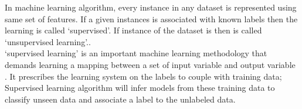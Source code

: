 In machine learning algorithm, every instance in any dataset is represented using same set of features. If a given instances is associated with known labels then the learning is called `supervised'. If instance of the dataset is  then is called `unsupervised learning'.\cite{maglogiannis2007emerging}.\\

`supervised learning' is an important machine learning methodology that demands learning a mapping between a set of input variable and output variable . It prescribes the learning system on the labels to couple with training data; Supervised learning algorithm will infer models from these training data to classify unseen data and associate a label to the unlabeled data.\cite{cord2008machine}\\  



